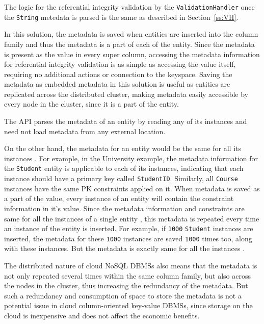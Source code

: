 	The logic for the referential integrity validation by the
	\texttt{ValidationHandler} once the \texttt{String} metedata is parsed is the
	same as described in Section~\ref{ss:VH}.

	In this solution, the metadata is saved  when entities are inserted into the
	column family and thus the metadata is a part of each of the entity.  Since the
	metadata is present as the value in every super column,  accessing the metadata
	information for referential integrity validation is as simple as accessing the
	value itself,  requiring no additional actions or connection to the
	keyspace. Saving the metadata as embedded metadata in this solution is useful
	as entities are replicated across the distributed cluster, making metadata
	easily accessible by every node in the cluster, since it is a part of the
	entity.

	The \ac{API} parses the metadata of an entity by reading any of its
	instances and need not load metadata from any external location.

	On the other hand,  the metadata for an entity would be the same for all its
	instances .  For example,  in the University example,  the metadata
	information for the \texttt{Student} entity is applicable to each of its
	instances,  indicating that each instance  should have a primary key called
	\texttt{StudentID}.
	Similarly,  all \texttt{Course} instances have the same \ac{PK} constraints
	applied on it.  When metadata is saved as a part of the  value,
	every instance of an entity will contain the constraint information
	in it's value.  Since the metadata information and constraints are same for all
	the instances of a single entity ,  this metadata is repeated every time an
	instance of the entity is inserted.  For example,  if
	\texttt{1000} \texttt{Student} instances are inserted,  the metadata for these
	\texttt{1000} instances are saved \texttt{1000} times too, along with these
	instances.  But the metadata is exactly same for all the
	instances .


	The distributed nature of cloud \ac{NoSQL} \acp{DBMS} also means that the
	metadata is not only repeated several times within the same column family,  but
	also across the nodes in the cluster, thus increasing the redundancy of
	the metadata.  But such a redundancy and consumption
	of space to store the metadata is not a potential issue
	in cloud column-oriented key-value \acp{DBMS}, since storage on the cloud is
	inexpensive and  does not affect the economic benefits.

